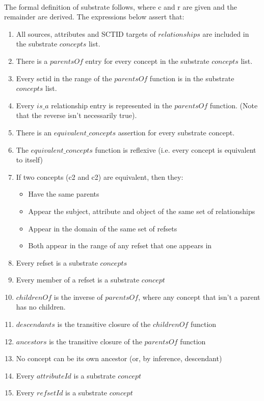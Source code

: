 \documentclass{article}
\begin{document}
\paragraph{}
The formal definition of substrate follows, where c and r are given and the remainder are derived.  The expressions below assert that:
\begin{enumerate}
\item All sources, attributes and SCTID targets of $relationships$ are included in the substrate $concepts$ list.
\item There is a $parentsOf$ entry for every concept in the substrate $concepts$ list.
\item Every sctid in the range of the $parentsOf$ function is in the substrate $concepts$ list.
\item Every $is\_a$ relationship entry is represented in the $parentsOf$ function.  (Note that the reverse isn't necessarily true).
\item There is an $equivalent\_concepts$ assertion for every substrate concept.
\item The $equivalent\_concepts$ function is reflexive (i.e. every concept is equivalent to itself)
\item If two concepts (c2 and c2) are equivalent, then they:
\begin{itemize}[noitemsep,nolistsep]
\item Have the same parents
\item Appear the subject, attribute and object of the same set of relationships
\item Appear in the domain of the same set of refsets
\item Both appear in the range of any refset that one appears in
\end{itemize}
\item Every refset is a substrate $concepts$
\item Every member of a refset is a substrate $concept$
\item $childrenOf$ is the inverse of $parentsOf$, where any concept that isn't a parent has no children.
\item $descendants$ is the transitive closure of the $childrenOf$ function
\item $ancestors$ is the transitive closure of the $parentsOf$ function
\item No concept can be its own ancestor (or, by inference, descendant)
\item Every $attributeId$ is a substrate $concept$
\item Every $refsetId$ is a substrate $concept$
\end{enumerate}
\end{document}

